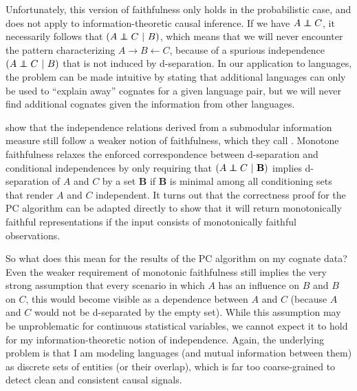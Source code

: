 Unfortunately, this version of faithfulness only holds in the probabilistic case, and does not apply to information-theoretic causal inference. If we have $A \indep C$, it necessarily follows that $(A \indep C\ |\ B)$, which means that we will never encounter the pattern characterizing $A \rightarrow B \leftarrow C$, because of a spurious independence $(A \indep C\ |\ B)$ that is not induced by d-separation. In our application to languages, the problem can be made intuitive by stating that additional languages can only be used to ``explain away'' cognates for a given language pair, but we will never find additional cognates given the information from other languages.

\cite{steudel_ea_2010} show that the independence relations derived from a submodular information measure still follow a weaker notion of faithfulness, which they call \textit{}. Monotone faithfulness relaxes the enforced correspondence between d-separation and conditional independences by only requiring that $(A \indep C\ |\ \mathbf{B})$ implies d-separation of $A$ and $C$ by a set $\mathbf{B}$ if $\mathbf{B}$ is minimal among all conditioning sets that render $A$ and $C$ independent. It turns out that the correctness proof for the PC algorithm can be adapted directly to show that it will return monotonically faithful representations if the input consists of monotonically faithful observations.

So what does this mean for the results of the PC algorithm on my cognate data? Even the weaker requirement of monotonic faithfulness still implies the very strong assumption that every scenario in which $A$ has an influence on $B$ and $B$ on $C$, this would become visible as a dependence between $A$ and $C$ (because $A$ and $C$ would not be d-separated by the empty set). While this assumption may be unproblematic for continuous statistical variables, we cannot expect it to hold for my information-theoretic notion of independence. Again, the underlying problem is that I am modeling languages (and mutual information between them) as discrete sets of entities (or their overlap), which is far too coarse-grained to detect clean and consistent causal signals.

